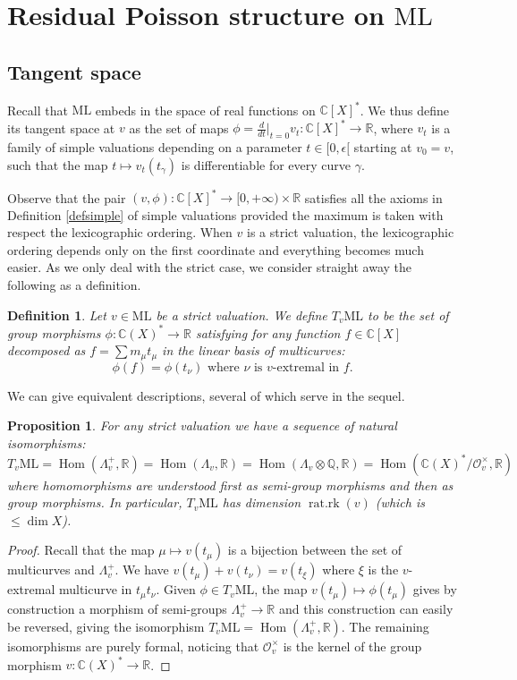 \documentclass{amsart}
\newtheorem{definition}{Definition}
\newtheorem{proposition}{Proposition}
\newcommand{\C}{\mathbb{C}}
\newcommand{\R}{\mathbb{R}}
\newcommand{\Q}{\mathbb{Q}}
\newcommand{\ML}{\mathrm{ML}}
\newcommand{\Oo}{\mathcal{O}}
\DeclareMathOperator{\Hom}{Hom}
\DeclareMathOperator{\ratrk}{\mathrm{rat.rk}}
\begin{document}
\section{Residual Poisson structure on $\ML$}\label{sectionpoisson}

\subsection{Tangent space}
Recall that $\ML$ embeds in the space of real functions on $\C[X]^*$. We thus define its tangent space at $v$ as the set of maps $\phi=\frac{d}{dt}\big|_{t=0}v_t:\C[X]^*\to \R$, where $v_t$ is a family of simple valuations depending on a parameter $t\in [0,\epsilon[$ starting at $v_0=v$, such that the map $t\mapsto v_t(t_\gamma)$ is differentiable for every curve $\gamma$.

Observe that the pair $(v,\phi):\C[X]^*\to [0,+\infty)\times \R$ satisfies all the axioms in Definition \ref{defsimple} of simple valuations provided the maximum is taken with respect the lexicographic ordering. When $v$ is a strict valuation, the lexicographic ordering depends only on the first coordinate and everything becomes much easier. As we only deal with the strict case, we consider straight away the following as a definition.

\begin{definition}
Let $v\in \ML$ be a strict valuation. We define $T_v\ML$ to be the set of group morphisms $\phi:\C(X)^*\to \R$ satisfying for any function $f \in \C[X]$ decomposed as $f=\sum m_\mu t_\mu$ in the linear basis of multicurves:
\begin{equation}\label{stricto}
\phi(f)=\phi(t_{\nu})\text{ where }\nu\text{ is }v\text{-extremal in }f.
\end{equation}
\end{definition}

We can give equivalent descriptions, several of which serve in the sequel.

\begin{proposition}\label{isomorphisms}
For any strict valuation we have a sequence of natural isomorphisms:
$$T_v\ML=\Hom(\Lambda_v^+,\R)=\Hom(\Lambda_v,\R)=\Hom(\Lambda_v\otimes \Q,\R)=\Hom(\C(X)^*/\Oo_v^\times,\R)$$
where homomorphisms are understood first as semi-group morphisms and then as group morphisms. In particular, $T_v\ML$ has dimension $\ratrk(v)$ (which is $\le \dim X$).
\end{proposition}
\begin{proof}
Recall that the map $\mu\mapsto v(t_\mu)$ is a bijection between the set of multicurves and $\Lambda_v^+$. We have $v(t_\mu)+v(t_\nu)=v(t_\xi)$ where $\xi$ is the $v$-extremal multicurve in $t_\mu t_\nu$. Given $\phi\in T_v\ML$, the map $v(t_\mu)\mapsto \phi(t_\mu)$ gives by construction a morphism of semi-groups $\Lambda_v^+\to \R$ and this construction can easily be reversed, giving the isomorphism $T_v\ML=\Hom(\Lambda_v^+,\R)$. 
%
The remaining isomorphisms are purely formal, noticing that $\Oo_v^\times$ is the kernel of the group morphism $v:\C(X)^*\to \R$. \end{proof}
\end{document}
